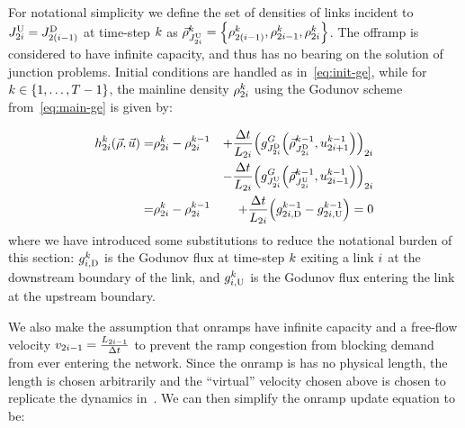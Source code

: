 			For notational simplicity we define the set of densities of links
			incident to $\jup{2\link}=\jdown{2\left(\link-1\right)}$ at time-step
			$k$ as $\juncstate{\jup{2\link}}{\tind}=\left\{ \discrete{2\left(\link-1\right)}{\tind},\discrete{2i-1}{\tind},\discrete{2\link}{\tind}\right\} $.
			The offramp is considered to have infinite capacity, and thus has
			no bearing on the solution of junction problems. Initial conditions
			are handled as in~\eqref{eq:init-ge}, while for $k\in\intrange 1{\ntime-1}$,
			the mainline density $\rho_{2i}^{k}$ using the Godunov
			scheme from~\eqref{eq:main-ge} is given by:
			
			\begin{eqnarray}
				\syseq_{2\link}^{\tind}(\state,\control)= & \discrete{2\link}{\tind}-\discrete{2\link}{\tind-1} & +\dfrac{\Delta t}{\length_{2\link}}\left(\god_{\jdown{2\link}}\left(\juncstate{\jdown{2\link}}{\tind-1},\ramp_{2\link+1}^{\tind-1}\right)\right)_{2\link}\label{eq:rho-update}\\
				&  & -\dfrac{\Delta t}{\length_{2\link}}\left(\god_{\jup{2\link}}\left(\juncstate{\jup{2\link}}{\tind-1},\ramp_{2\link-1}^{\tind-1}\right)\right)_{2\link}\nonumber \\
				= & \discrete{2\link}{\tind}-\discrete{2\link}{\tind-1} & +\frac{\Delta t}{\length_{2\link}}\left(\fout{2\link}{\tind-1}-\fin{2\link}{\tind-1}\right)=0
			\end{eqnarray}
			where we have introduced some substitutions to reduce the notational
			burden of this section: $g_{i,\text{D}}^{k}$ is the Godunov flux
			at time-step $k$ exiting a link $i$ at the downstream boundary
			of the link, and $g_{i,\text{U}}^{k}$ is the Godunov flux entering
			the link at the upstream boundary.
			
			We also make the assumption that onramps have infinite capacity and
			a free-flow velocity $v_{2i-1}=\frac{L_{2i-1}}{\Delta t}$
			to prevent the ramp congestion from blocking demand from ever entering
			the network. Since the onramp is has no physical length, the length
			is chosen arbitrarily and the ``virtual'' velocity chosen above
			is chosen to replicate the dynamics in~\cite{Monache2013}. We can
			then simplify the onramp update equation to be:
			
